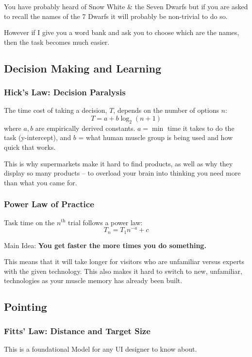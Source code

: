You have probably heard of Snow White \& the Seven Dwarfs but if you are asked to recall the names of the 7 Dwarfs it will probably be non-trivial to do so.

However if I give you a word bank and ask you to choose which are the names, then the task becomes much easier.

\subsection{Decision Making and Learning}
\subsubsection{Hick's Law: Decision Paralysis}
The time cost of taking a decision, $T$, depends on the number of options $n$:
\begin{equation}
    T = a + b\log_2(n+1)
\end{equation}
where $a, b$ are empirically derived constants. $a = \min$ time it takes to do the task (y-intercept), and $b$ = what human muscle group is being used and how quick that works.

This is why supermarkets make it hard to find products, as well as why they display so many products -- to overload your brain into thinking you need more than what you came for.

\subsubsection{Power Law of Practice}
Task time on the $n^{\text{th}}$ trial follows a power law:
\begin{equation}
    T_n = T_1 n^{-a} + c
\end{equation}
\begin{shaded}
    Main Idea: \textbf{You get faster the more times you do something.}
\end{shaded}
This means that it will take longer for visitors who are unfamiliar versus experts with the given technology. This also makes it hard to switch to new, unfamiliar, technologies as your muscle memory has already been built.

\subsection{Pointing}
\subsubsection{Fitts' Law: Distance and Target Size}
This is a foundational Model for any UI designer to know about.

